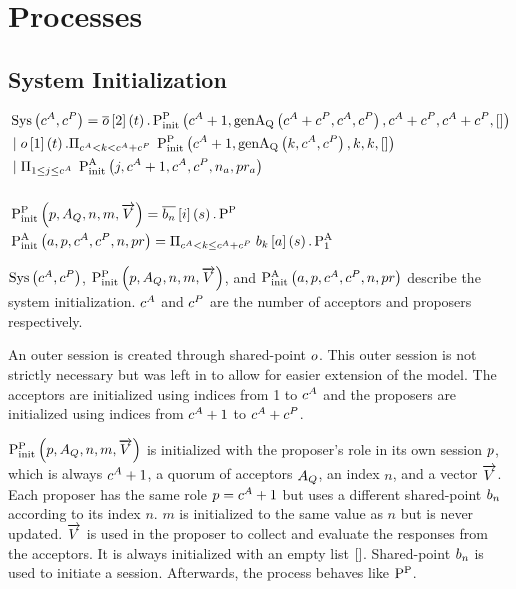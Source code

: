 \section{Processes}
\subsection{System Initialization}
\begin{align*}
&\operatorname{Sys}\left(c^A, c^P\right) = \overline{o}\left[2\right]\left(t\right) . \operatorname{P^{P}_{init}}\left(c^A + 1, \operatorname{genA_Q}\left(c^A + c^P, c^A, c^P\right), c^A + c^P, c^A + c^P, \mathtt{[]}\right)\\
&\; | \; o\left[1\right]\left(t\right) . \Pi_{c^A < k < c^A + c^P}\; \operatorname{P^{P}_{init}}\left(c^A + 1, \operatorname{genA_Q}\left(k, c^A, c^P\right), k, k, \mathtt{[]}\right) \\
&\; | \; \Pi_{1 \leq j \leq c^A}\; \operatorname{P^{A}_{init}}\left(j, c^A + 1, c^A, c^P, n_{a}, pr_{a}\right)\\
\\
&\operatorname{P^{P}_{init}}\left(p, A_Q, n, m, \overrightarrow{V}\right) = \overline{b_{n}}\left[i\right]\left(s\right) . \operatorname{P^{P}_{}}\\
&\operatorname{P^{A}_{init}}\left(a, p, c^A, c^P, n, pr\right) = \Pi_{c^A < k \le c^A + c^P}\; b_{k}\left[a\right]\left(s\right) . \operatorname{P^{A}_{1}}
\end{align*}

$\operatorname{Sys}\left(c^A, c^P\right)$, $\operatorname{P^{P}_{init}}\left(p, A_Q, n, m, \overrightarrow{V}\right)$, and $\operatorname{P^{A}_{init}}\left(a, p, c^A, c^P, n, pr\right)$ describe the system initialization.
$c^A$ and $c^P$ are the number of acceptors and proposers respectively.

An outer session is created through shared-point $o$.
This outer session is not strictly necessary but was left in to allow for easier extension of the model.
The acceptors are initialized using indices from 1 to $c^A$ and the proposers are initialized using indices from $c^A + 1$ to $c^A + c^P$.

$\operatorname{P^{P}_{init}}\left(p, A_Q, n, m, \overrightarrow{V}\right)$ is initialized with the proposer's role in its own session $p$, which is always $c^A + 1$, a quorum of acceptors $A_Q$, an index $n$, and a vector $\overrightarrow{V}$.
Each proposer has the same role $p = c^A + 1$ but uses a different shared-point $b_{n}$ according to its index $n$.
$m$ is initialized to the same value as $n$ but is never updated.
$\overrightarrow{V}$ is used in the proposer to collect and evaluate the responses from the acceptors.
It is always initialized with an empty list $\mathtt{[]}$.
Shared-point $b_{n}$ is used to initiate a session.
Afterwards, the process behaves like $\operatorname{P^{P}_{}} $.

